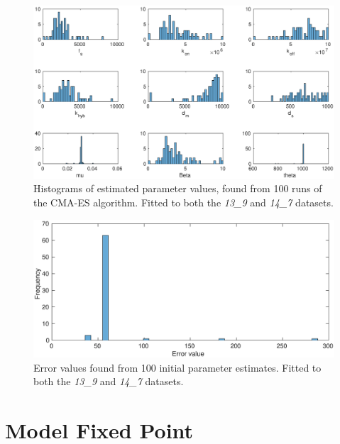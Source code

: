 \documentclass[10pt,journal]{./IEEE_latex_class/IEEEtran}
\begin{document}
\begin{figure}[H]
   \centering
        \includegraphics[scale = 0.4]{13_9_14_7_hist}
        \caption{Histograms of estimated parameter values, found from 100 runs of the CMA-ES algorithm. Fitted to both the  \textit{13\_9} and \textit{14\_7} datasets.}
        \label{}
\end{figure}

\begin{figure}[H]
   \centering
        \includegraphics[scale = 0.3]{13_9_14_7_f_hist}
        \caption{Error values found from 100 initial parameter estimates. Fitted to both the  \textit{13\_9} and \textit{14\_7} datasets.}
        \label{}
\end{figure}

\clearpage

\section{Model Fixed Point}
\label{ModelFixedPoint}
\setcounter{figure}{0} 
 
\end{document}
